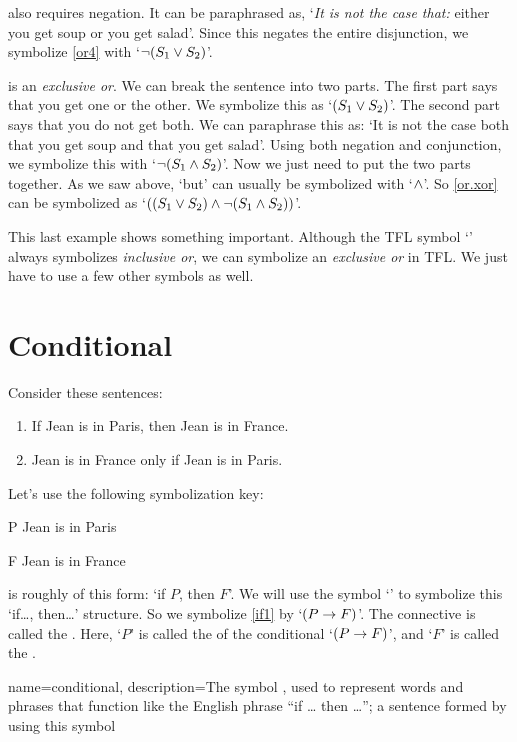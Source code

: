 also requires negation. It can be paraphrased as, `\emph{It is not the case that:} either you get soup or you get salad'. Since this negates the entire disjunction, we symbolize \cref*{or4} with `$\neg (S_1 \vee S_2)$'.

 is an \emph{exclusive or}. We can break the sentence into two parts. The first part says that you get one or the other. We symbolize this as `$(S_1 \vee S_2)$'. The second part says that you do not get both. We can paraphrase this as: `It is not the case both that you get soup and that you get salad'. Using both negation and conjunction, we symbolize this with `$\neg(S_1 \wedge S_2)$'. Now we just need to put the two parts together. As we saw above, `but' can usually be symbolized with `$\wedge$'. So \cref*{or.xor} can be symbolized as `$((S_1 \vee S_2) \wedge \neg(S_1 \wedge S_2))$'.

This last example shows something important. Although the TFL symbol `\eor' always symbolizes \emph{inclusive or}, we can symbolize an \emph{exclusive or} in {TFL}. We just have to use a few other symbols as well.

\section{Conditional}
Consider these sentences:
	\begin{enumerate}
		\item\label{if1} If Jean is in Paris, then Jean is in France.
		\item\label{if2} Jean is in France only if Jean is in Paris.
	\end{enumerate}
Let's use the following symbolization key:
	\begin{ekey}
		\item[P] Jean is in Paris
		\item[F] Jean is in France
	\end{ekey}
 is roughly of this form: `if $P$, then $F$'. We will use
the symbol `\eif' to symbolize this `if\ldots, then\ldots' structure.
So we symbolize \cref*{if1} by `$(P\rightarrow F)$'. The connective is called
the . Here, `$P$' is called the
 of the conditional `$(P \rightarrow F)$', and `$F$' is
called the .

{
name=conditional,
description={The symbol \eif, used to represent words and phrases that function like the English phrase ``if \dots{} then \dots''; a sentence formed by using this symbol}
}

